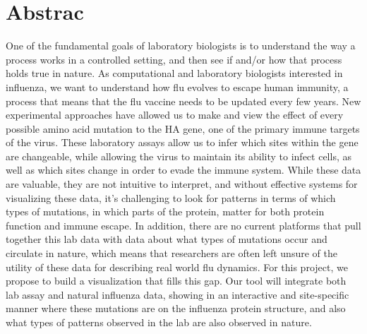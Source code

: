 \documentclass[sigchi]{acmart}
\begin{document}


\maketitle

\section{Abstrac}
One of the fundamental goals of laboratory biologists is to understand the way a process works in a controlled setting, and then see if and/or how that process holds true in nature. As computational and laboratory biologists interested in influenza, we want to understand how flu evolves to escape human immunity, a process that means that the flu vaccine needs to be updated every few years. New experimental approaches have allowed us to make and view the effect of every possible amino acid mutation to the HA gene, one of the primary immune targets of the virus. These laboratory assays allow us to infer which sites within the gene are changeable, while allowing the virus to maintain its ability to infect cells, as well as which sites change in order to evade the immune system. While these data are valuable, they are not intuitive to interpret, and without effective systems for visualizing these data, it’s challenging to look for patterns in terms of which types of mutations, in which parts of the protein, matter for both protein function and immune escape. In addition, there are no current platforms that pull together this lab data with data about what types of mutations occur and circulate in nature, which means that researchers are often left unsure of the utility of these data for describing real world flu dynamics. For this project, we propose to build a visualization that fills this gap. Our tool will integrate both lab assay and natural influenza data, showing in an interactive and site-specific manner where these mutations are on the influenza protein structure, and also what types of patterns observed in the lab are also observed in nature.
\end{document}
